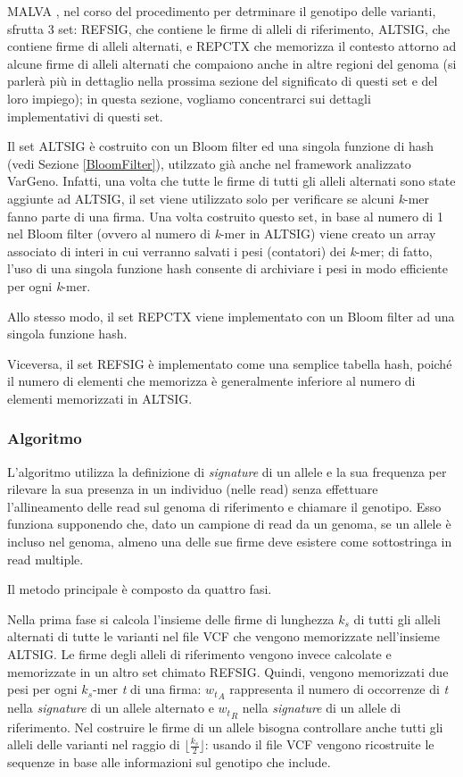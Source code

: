 \documentclass[../main.tex]{subfiles}
\begin{document}
MALVA , nel corso del procedimento per detrminare il genotipo delle varianti, sfrutta 3 set: REFSIG, che contiene le firme di alleli di riferimento, ALTSIG, che contiene firme di alleli alternati, e REPCTX che memorizza il contesto attorno ad alcune firme di alleli alternati che compaiono anche in altre regioni del genoma (si parlerà più in dettaglio nella prossima sezione del significato di questi set e del loro impiego); in questa sezione, vogliamo concentrarci sui dettagli implementativi di questi set.

Il set ALTSIG è costruito con un Bloom filter ed una singola funzione di hash (vedi Sezione \ref{BloomFilter}), utilzzato già anche nel framework analizzato VarGeno. Infatti, una volta che tutte le firme di tutti gli alleli alternati sono state aggiunte ad ALTSIG, il set viene utilizzato solo per verificare se alcuni \textit{k}-mer fanno parte di una firma. Una volta costruito questo set, in base al numero di 1 nel Bloom filter (ovvero al numero di \textit{k}-mer in ALTSIG) viene creato un array associato di interi in cui verranno salvati i pesi (contatori) dei \textit{k}-mer; di fatto, l'uso di una singola funzione hash consente di archiviare i pesi in modo efficiente per ogni \textit{k}-mer.
 
Allo stesso modo, il set REPCTX viene implementato con un Bloom filter ad una singola funzione hash. 

Viceversa, il set REFSIG è implementato come una semplice tabella hash, poiché il numero di elementi che memorizza è generalmente inferiore al numero di elementi memorizzati in ALTSIG. 


\subsubsection{Algoritmo}

L'algoritmo utilizza la definizione di \textit{signature} di un allele e la sua frequenza per rilevare la sua presenza in un individuo (nelle read) senza effettuare l'allineamento delle read sul genoma di riferimento e chiamare il genotipo. Esso funziona supponendo che, dato un campione di read da un genoma, se un allele è incluso nel genoma, almeno una delle sue firme deve esistere come sottostringa in read multiple.

Il metodo principale è composto da quattro fasi.

Nella prima fase si calcola l'insieme delle firme di lunghezza \textit{${k}_{s}$} di tutti gli alleli alternati di tutte le varianti nel file VCF che vengono memorizzate nell'insieme ALTSIG. Le firme degli alleli di riferimento vengono invece calcolate e memorizzate in un altro set chimato REFSIG. Quindi, vengono memorizzati due pesi per ogni \textit{${k}_{s}$}-mer \textit{t} di una firma: \textit{${w_{t}}_{A}$} rappresenta il numero di occorrenze di \textit{t} nella \textit{signature} di un allele alternato e \textit{${w_{t}}_{R}$} nella \textit{signature} di un allele di riferimento. Nel costruire le firme di un allele bisogna controllare anche tutti gli alleli delle varianti nel raggio di $\lfloor \frac{ {{{k}_{s}} }}{2}  \rfloor$: usando il file VCF vengono ricostruite le sequenze in base alle informazioni sul genotipo che include. 
\end{document}
